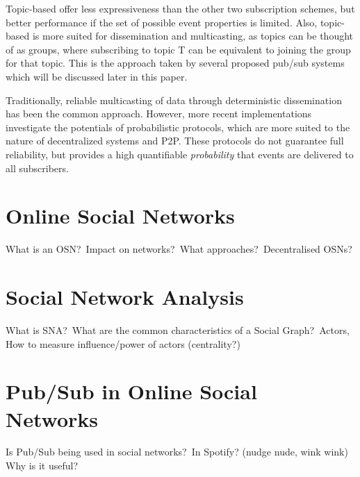 Topic-based offer less expressiveness than the other two subscription
schemes, but better performance if the set of possible event properties
is limited. Also, topic-based is more suited for dissemination and
multicasting, as topics can be thought of as groups, where subscribing
to topic T can be equivalent to joining the group for that topic. This
is the approach taken by several proposed pub/sub systems which will be
discussed later in this paper.

Traditionally, reliable multicasting of data through deterministic
dissemination has been the common approach. However, more recent
implementations investigate the potentials of probabilistic protocols,
which are more suited to the nature of decentralized systems and P2P.
These protocols do not guarantee full reliability, but provides a high
quantifiable \emph{probability} that events are delivered to all
subscribers.

\section{Online Social Networks}
What is an OSN?\ Impact on networks?\ What approaches?\ Decentralised OSNs?
\section{Social Network Analysis}
What is SNA?\ What are the common characteristics of a Social Graph?\
Actors, How to measure influence/power of actors (centrality?)
\section{Pub/Sub in Online Social Networks}
Is Pub/Sub being used in social networks?\, In Spotify? (nudge nude, wink wink) Why is it
useful?\
